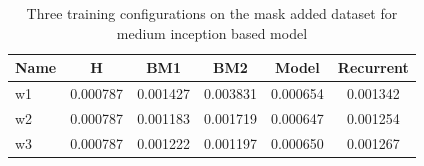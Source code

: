 \begin{table}[htbp]
	\centering
	\caption{Three training configurations on the mask added dataset for medium inception based model}
	\label{tab:medium_mask}
	\begin{tabular}{p{2cm}ccccc}
		\toprule
		Name &  H &  BM1 &  BM2 &  Model &  Recurrent \\
		\midrule
		w1 &       0.000787 &        0.001427 &        0.003831 &   0.000654 &            0.001342 \\
		w2 &       0.000787 &        0.001183 &        0.001719 &   0.000647 &            0.001254 \\
		w3 &       0.000787 &        0.001222 &        0.001197 &   0.000650 &            0.001267 \\
		\bottomrule
	\end{tabular}
\end{table}


